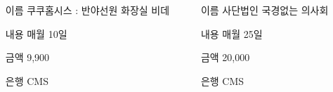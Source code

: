 \documentclass[	25pt, 
							a0paper, 
							portrait, %
							margin=0mm, %
							innermargin=10mm,  		%
							blockverticalspace=4mm, %
							colspace=5mm, 
							subcolspace=0mm
							]{tikzposter}
\begin{document}
\begin{columns}
		{
			\setlength{\leftmargini}{7em}			
			\setlength{\labelsep}{1em} %
			\begin{LARGE}
			\begin{itemize}
			\item [이름] 쿠쿠홈시스 : 반야선원 화장실 비데
			\item [내용] 매월 10일
			\item [금액] 9,900
			\item [은행] CMS
			\end{itemize}
			\end{LARGE}
		}		

		{
			\setlength{\leftmargini}{7em}			
			\setlength{\labelsep}{1em} %
			\begin{LARGE}
			\begin{itemize}
			\item [이름] 사단법인 국경없는 의사회
			\item [내용] 매월 25일
			\item [금액] 20,000
			\item [은행] CMS
			\end{itemize}
			\end{LARGE}
		}		


%
%


\end{columns}
\end{document}
